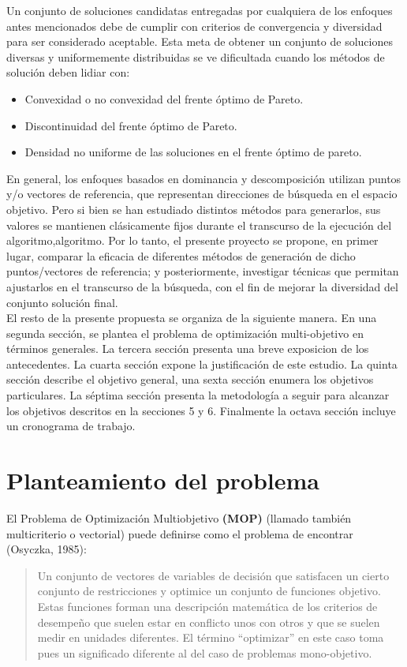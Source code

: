 \documentclass[letterpaper,10pt]{article}
\begin{document}
Un conjunto de soluciones candidatas entregadas por cualquiera de los enfoques antes mencionados debe de cumplir con criterios de convergencia y diversidad para ser
considerado aceptable. Esta meta de obtener un conjunto de soluciones diversas y uniformemente distribuidas se ve dificultada cuando los métodos de solución deben lidiar con:

\begin{itemize}
 \item Convexidad o no convexidad del frente óptimo de Pareto.
 \item Discontinuidad del frente óptimo de Pareto.
 \item Densidad no uniforme de las soluciones en el frente óptimo de pareto.
\end{itemize}

En general, los enfoques basados en dominancia y descomposición utilizan puntos y/o vectores de referencia, que representan direcciones de búsqueda en el espacio objetivo. Pero si bien se han estudiado distintos métodos para generarlos,
sus valores se mantienen clásicamente fijos durante el transcurso de la ejecución del algoritmo,algoritmo. Por lo tanto, el presente proyecto se propone, en primer lugar, comparar la eficacia de diferentes métodos de generación de dicho puntos/vectores de referencia;
y posteriormente, investigar técnicas que permitan ajustarlos en el transcurso de la búsqueda, con el fin de mejorar la diversidad del conjunto solución final.\\

El resto de la presente propuesta se organiza de la siguiente manera. En una segunda sección, se plantea el problema de optimización multi-objetivo en términos generales.
La tercera sección presenta una breve exposicion de los antecedentes. La cuarta sección expone la justificación de este estudio. La quinta sección describe el objetivo general,
una sexta sección enumera los objetivos particulares. La séptima sección presenta la metodología a seguir para alcanzar los objetivos descritos en la secciones 5 y 6.
Finalmente la octava sección incluye un cronograma de trabajo.

 
\section{Planteamiento del problema}

El Problema de Optimización Multiobjetivo \textbf{(MOP)} (llamado también
multicriterio o vectorial) puede definirse como el problema de
encontrar (Osyczka, 1985)\cite{Osyczka1985193}:
\begin{quote}
Un conjunto de vectores de variables de decisión que satisfacen un cierto
conjunto de restricciones y optimice un conjunto de funciones
objetivo. Estas funciones forman una descripción matemática
de los criterios de desempeño que suelen estar en conflicto
unos con otros y que se suelen medir en unidades diferentes.
El término ``optimizar'' en este caso toma pues un significado
diferente al del caso de problemas mono-objetivo.
\end{quote}
\end{document}
